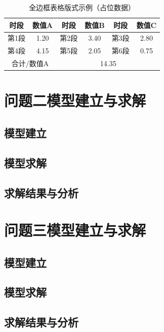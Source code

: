\documentclass{JXUSTmodeling}
\begin{document}
\begin{table}[H]
	\centering
	\caption{全边框表格版式示例（占位数据）}
	\begin{tabular}{|c|c|c|c|c|c|}
		\hline
		时段 & 数值A & 时段 & 数值B & 时段 & 数值C \\
		\hline
		第1段 & 1.20 & 第2段 & 3.40 & 第3段 & 2.80 \\
		\hline
		第4段 & 4.15 & 第5段 & 2.05 & 第6段 & 0.75 \\
		\hline
		\multicolumn{2}{|c|}{合计/数值A} & \multicolumn{4}{c|}{14.35} \\
		\hline
	\end{tabular}
	\label{tab:boxed_demo}
\end{table}

\section{问题二模型建立与求解}
\subsection{模型建立}

\subsection{模型求解}

\subsection{求解结果与分析}

\section{问题三模型建立与求解}
\subsection{模型建立}

\subsection{模型求解}

\subsection{求解结果与分析}
\end{document}
